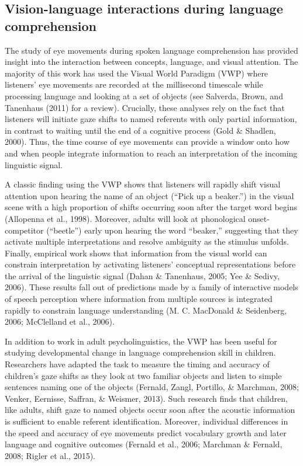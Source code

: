 \documentclass[,man,floatsintext]{apa6}
\begin{document}
\subsection{Vision-language interactions during language
comprehension}\label{vision-language-interactions-during-language-comprehension}

The study of eye movements during spoken language comprehension has
provided insight into the interaction between concepts, language, and
visual attention. The majority of this work has used the Visual World
Paradigm (VWP) where listeners' eye movements are recorded at the
millisecond timescale while processing language and looking at a set of
objects (see Salverda, Brown, and Tanenhaus (2011) for a review).
Crucially, these analyses rely on the fact that listeners will initiate
gaze shifts to named referents with only partial information, in
contrast to waiting until the end of a cognitive process (Gold \&
Shadlen, 2000). Thus, the time course of eye movements can provide a
window onto how and when people integrate information to reach an
interpretation of the incoming linguistic signal.

A classic finding using the VWP shows that listeners will rapidly shift
visual attention upon hearing the name of an object (\enquote{Pick up a
beaker.}) in the visual scene with a high proportion of shifts occurring
soon after the target word begins (Allopenna et al., 1998). Moreover,
adults will look at phonological onset-competitor (\enquote{beetle})
early upon hearing the word \enquote{beaker,} suggesting that they
activate multiple interpretations and resolve ambiguity as the stimulus
unfolds. Finally, empirical work shows that information from the visual
world can constrain interpretation by activating listeners' conceptual
representations before the arrival of the linguistic signal (Dahan \&
Tanenhaus, 2005; Yee \& Sedivy, 2006). These results fall out of
predictions made by a family of interactive models of speech perception
where information from multiple sources is integrated rapidly to
constrain language understanding (M. C. MacDonald \& Seidenberg, 2006;
McClelland et al., 2006).

In addition to work in adult psycholinguistics, the VWP has been useful
for studying developmental change in language comprehension skill in
children. Researchers have adapted the task to measure the timing and
accuracy of children's gaze shifts as they look at two familiar objects
and listen to simple sentences naming one of the objects (Fernald,
Zangl, Portillo, \& Marchman, 2008; Venker, Eernisse, Saffran, \&
Weismer, 2013). Such research finds that children, like adults, shift
gaze to named objects occur soon after the acoustic information is
sufficient to enable referent identification. Moreover, individual
differences in the speed and accuracy of eye movements predict
vocabulary growth and later language and cognitive outcomes (Fernald et
al., 2006; Marchman \& Fernald, 2008; Rigler et al., 2015).
\end{document}
